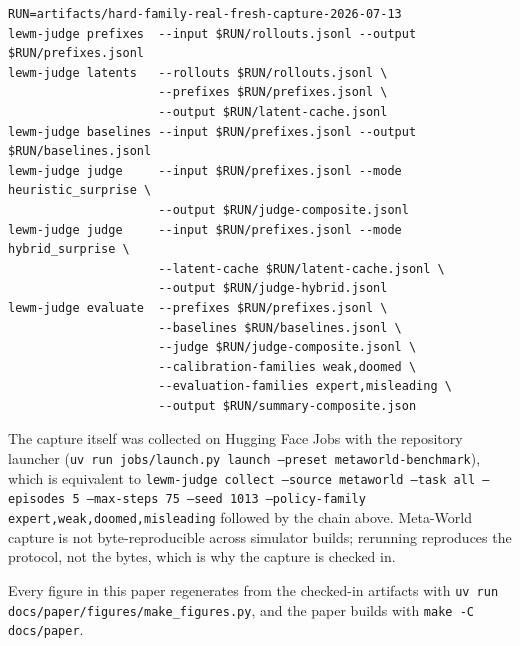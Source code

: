 \documentclass[11pt]{article}
\begin{document}
\begin{small}
\begin{verbatim}
RUN=artifacts/hard-family-real-fresh-capture-2026-07-13
lewm-judge prefixes  --input $RUN/rollouts.jsonl --output $RUN/prefixes.jsonl
lewm-judge latents   --rollouts $RUN/rollouts.jsonl \
                     --prefixes $RUN/prefixes.jsonl \
                     --output $RUN/latent-cache.jsonl
lewm-judge baselines --input $RUN/prefixes.jsonl --output $RUN/baselines.jsonl
lewm-judge judge     --input $RUN/prefixes.jsonl --mode heuristic_surprise \
                     --output $RUN/judge-composite.jsonl
lewm-judge judge     --input $RUN/prefixes.jsonl --mode hybrid_surprise \
                     --latent-cache $RUN/latent-cache.jsonl \
                     --output $RUN/judge-hybrid.jsonl
lewm-judge evaluate  --prefixes $RUN/prefixes.jsonl \
                     --baselines $RUN/baselines.jsonl \
                     --judge $RUN/judge-composite.jsonl \
                     --calibration-families weak,doomed \
                     --evaluation-families expert,misleading \
                     --output $RUN/summary-composite.json
\end{verbatim}
\end{small}

The capture itself was collected on Hugging Face Jobs with the repository launcher
(\texttt{uv run jobs/launch.py launch --preset metaworld-benchmark}), which is equivalent to
\texttt{lewm-judge collect --source metaworld --task all --episodes 5 --max-steps 75 --seed
1013 --policy-family expert,weak,doomed,misleading} followed by the chain above. Meta-World
capture is not byte-reproducible across simulator builds; rerunning reproduces the protocol,
not the bytes, which is why the capture is checked in.

Every figure in this paper regenerates from the checked-in artifacts with
\texttt{uv run docs/paper/figures/make\_figures.py}, and the paper builds with
\texttt{make -C docs/paper}.
\end{document}
